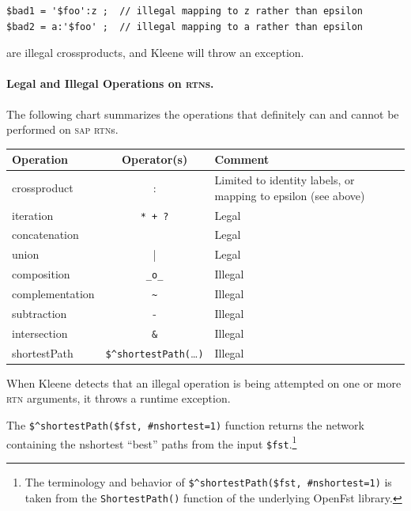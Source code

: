 \documentclass[letterpaper,12pt]{article}
\newcommand{\acro}{\textsc}
\begin{document}
\begin{Verbatim}[fontsize=\small]
$bad1 = '$foo':z ;  // illegal mapping to z rather than epsilon
$bad2 = a:'$foo' ;  // illegal mapping to a rather than epsilon
\end{Verbatim}

\noindent
are illegal crossproducts, and Kleene will throw an exception.

\paragraph{Legal and Illegal Operations on \acro{rtn}s.}

The following chart summarizes the operations that definitely can and
cannot be performed on \acro{sap} \acro{rtn}s.

\vspace{.5cm}

\noindent
\begin{tabular}{|l|c|p{5.7cm}|}
\hline
\textbf{Operation} & \textbf{Operator(s)} & \textbf{Comment} \\
\hline
\hline
crossproduct & : & Limited to identity labels, or mapping to epsilon (see
above)\\
\hline
iteration & \verb!* + ?! {} & Legal \\
\hline
concatenation & & Legal \\
\hline
union & | & Legal \\
\hline
\hline
composition & \verb!_o_! & Illegal \\
\hline
complementation & \verb!~! & Illegal \\
\hline
subtraction & - & Illegal \\
\hline
intersection & \verb!&! & Illegal \\
\hline
shortestPath & \verb!$^shortestPath(!\ldots\verb!)! & Illegal \\
\hline
\end{tabular}

\vspace{.5cm}

\noindent
When Kleene detects that an illegal operation is being attempted on one or more
\acro{rtn} arguments, it throws a runtime exception.


The \verb!$^shortestPath($fst, #nshortest=1)! function returns the
network containing the nshortest ``best'' paths from the input
\verb!$fst!.\footnote{The terminology and behavior of
\verb!$^shortestPath($fst, #nshortest=1)! is taken from the
\verb!ShortestPath()! function of the underlying OpenFst library.}  
\end{document}

